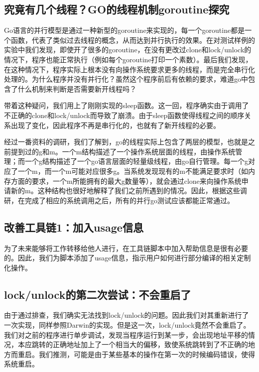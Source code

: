 \documentclass{article}
\begin{document}
\subsection{究竟有几个线程？GO的线程机制goroutine探究}
Go语言的并行模型是通过一种新型的goroutine来实现的，每一个goroutine都是一个函数，代表了类似过去线程的概念，从而达到并行执行的效果。在对测试样例的实验中我们发现，即使开了很多的goroutine，在没有更改过clone和lock/unlock的情况下，程序也能正常执行（例如每个goroutine打印一个素数）。最后我们发现，在这种情况下，程序实际上根本没有向操作系统要求更多的线程，而是完全串行化处理的。为什么程序并没有并行化？虽然这个程序前后有依赖的要求，难道go中包含了什么机制来判断是否需要新开线程吗？

带着这种疑问，我们用上了刚刚实现的sleep函数。这一回，程序确实由于调用了不正确的clone和lock/unlock而导致了崩溃。由于sleep函数使得线程之间的顺序关系出现了变化，因此程序不再是串行化的，也就有了新开线程的必要。

经过一番资料的调研，我们了解到，go的线程实际上包含了两层的模型，也就是之前提到过的g和m。一个m结构描述了一个操作系统层面的线程，由操作系统管理；而一个g结构描述了一个go语言层面的轻量级线程，由go自行管理。每一个g对应了一个m，而一个m可能对应很多g。当系统发现现有的m不能满足要求时（如内存方面的要求，一个m所能拥有的最大g数量等），就会通过clone来向操作系统申请新的m。这种结构也很好地解释了我们之前所遇到的情况。因此，根据这些调研，在完成了相应的系统调用之后，所有的并行go测试应该都能正常通过。

\subsection{改善工具链1：加入usage信息}
为了未来能够将工作转移给他人进行，在工具链脚本中加入帮助信息是很有必要的。因此，我们为脚本添加了usage信息，指示用户如何进行部分编译的相关定制化操作。

\subsection{lock/unlock的第二次尝试：不会重启了}
由于通过排查，我们确实无法找到lock/unlock的问题。因此我们对其重新进行了一次实现，同样参照Darwin的实现。但是这一次，lock/unlock竟然不会重启了。我们对之前的程序进行单步调试，发现当程序运行到某一步，会出现地址平移的情况，本应跳转的正确地址加上了一个相当大的偏移，致使系统跳转到了不正确的地方而重启。我们推测，可能是由于某些基本的操作在第一次的时候编码错误，使得系统重启。
\end{document}
